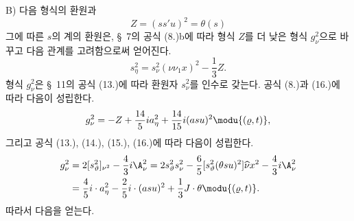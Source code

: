 
B) 다음 형식의 환원과
\[
Z=(ss'u)^2=\theta(s)
\]
그에 따른 $s$의 계의 환원은, \S\ 7의 공식 (8.)b에 따라 형식 $Z$를 더 낮은 형식 $g_\nu^2$으로 바꾸고 다음 관계를 고려함으로써 얻어진다.
\[
 s_\eta^2=s_\nu^2(\nu\nu_1x)^2-\frac13Z.
\]
형식 $g_\nu^2$은 \S\ 11의 공식 (13.)에 따라 환원자 $s_\nu^2$를 인수로 갖는다. 공식 (8.)과 (16.)에 따라 다음이 성립한다.
\[
 g_\nu^2=-Z+\frac{14}{5}ia_\eta^2+\frac{14}{15}i(asu)^2
 \modu{(\varrho,t)},
\]
그리고 공식 (13.), (14.), (15.), (16.)에 따라 다음이 성립한다.
\[
\begin{aligned}
g_\nu^2&=2[s_\vartheta^2]_{\nu^2}-\frac43 i\A_\nu^2
      =2s_\vartheta^2s_\nu^2-\frac65[s_\vartheta^2(\theta su)^2]\widehat{\nu}x^2
        -\frac43i\A_\nu^2\\
&=\frac45i\cdot a_\eta^2-\frac25i\cdot(asu)^2+\frac13J\cdot\theta
\modu{(\varrho,t)}.
\end{aligned}
\]
따라서 다음을 얻는다.

